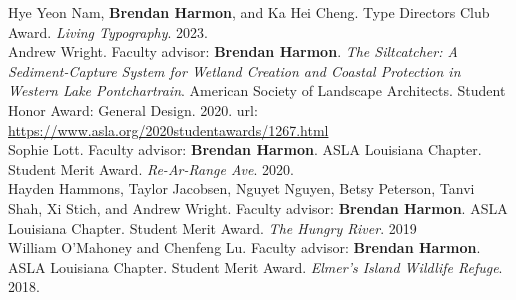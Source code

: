 \documentclass[10pt]{developercv} %
\begin{document}

Hye Yeon Nam, \textbf{Brendan Harmon}, and Ka Hei Cheng.
Type Directors Club Award.
\emph{Living Typography}.
2023.\\

Andrew Wright. Faculty advisor: \textbf{Brendan Harmon}. \emph{The Siltcatcher: A Sediment-Capture System for Wetland Creation and Coastal Protection in Western Lake Pontchartrain}. American Society of Landscape Architects. Student Honor Award: General Design. 2020. url: \url{https://www.asla.org/2020studentawards/1267.html}\\

Sophie Lott. Faculty advisor: \textbf{Brendan Harmon}. ASLA Louisiana Chapter. Student Merit Award. \emph{Re-Ar-Range Ave}. 2020.\\

Hayden Hammons, Taylor Jacobsen, Nguyet Nguyen, Betsy Peterson, Tanvi Shah, Xi Stich, and Andrew Wright. Faculty advisor: \textbf{Brendan Harmon}. ASLA Louisiana Chapter. Student Merit Award. \emph{The Hungry River}. 2019\\

William O'Mahoney and Chenfeng Lu. Faculty advisor: \textbf{Brendan Harmon}. ASLA Louisiana Chapter. Student Merit Award. \emph{Elmer’s Island Wildlife Refuge}. 2018.\\


\end{document}
